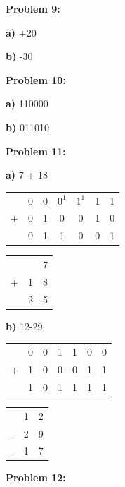 \documentclass{article}
\begin{document}
    \textbf{Problem 9:}

    \quad \textbf{a)} +20

    \quad\quad {}

    \quad \textbf{b)} -30

    \quad\quad {}

    \textbf{Problem 10:}

    \quad \textbf{a)} 110000

    \quad\quad {}

    \quad \textbf{b)} 011010

    \quad\quad {}

    \textbf{Problem 11:}

    \quad \textbf{a)} 7 + 18

    \begin{center}
        \begin{tabular}{ ccccccc }
              & 0 & 0 & $0^1$ & $1^1$ & 1 & 1 \\
            + & 0 & 1 & 0 & 0 & 1 & 0  \\
            \hline
            & 0 & 1 & 1 & 0 & 0 & 1
        \end{tabular}
        \quad\quad 
        \begin{tabular}{ ccc }
            & & 7 \\
            + & 1 & 8 \\
            \hline
            & 2 & 5
        \end{tabular}
    \end{center}

    \quad \textbf{b)} 12-29

    \begin{center}
        \begin{tabular}{ ccccccc }
              & 0 & 0 & 1 & 1 & 0 & 0 \\
            + & 1 & 0 & 0 & 0 & 1 & 1  \\
            \hline
            & 1 & 0 & 1 & 1 & 1 & 1
        \end{tabular}
        \quad\quad 
        \begin{tabular}{ ccc }
            & 1 & 2 \\
            - & 2 & 9 \\
            \hline
            -& 1 & 7
        \end{tabular}
    \end{center}

    \textbf{Problem 12:}
\end{document}

